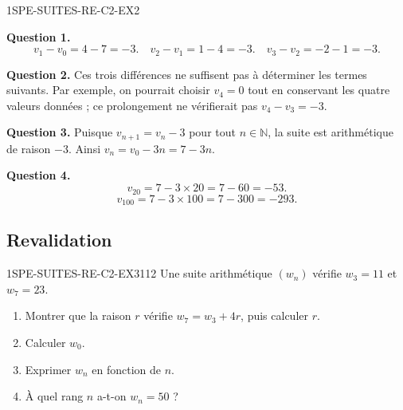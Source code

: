 
\begin{corrige}{1SPE-SUITES-RE-C2-EX2}

\textbf{Question 1.}
\[
v_1 - v_0 = 4 - 7 = -3. \quad v_2 - v_1 = 1 - 4 = -3. \quad v_3 - v_2 = -2 - 1 = -3.
\]


\textbf{Question 2.} Ces trois différences ne suffisent pas à déterminer les
termes suivants. Par exemple, on pourrait choisir $v_4=0$ tout en conservant
les quatre valeurs données ; ce prolongement ne vérifierait pas
$v_4-v_3=-3$.


\textbf{Question 3.} Puisque $v_{n+1}=v_n-3$ pour tout
$n\in\mathbb{N}$, la suite est arithmétique de raison $-3$. Ainsi
$v_n=v_0-3n=7-3n$.

\textbf{Question 4.}
\[
v_{20} = 7 - 3 \times 20 = 7 - 60 = -53.
\]
\[
v_{100} = 7 - 3 \times 100 = 7 - 300 = -293.
\]

\end{corrige}

\subsection*{Revalidation}


\begin{exercice}{1SPE-SUITES-RE-C2-EX3}{1}{12}
Une suite arithmétique $(w_n)$ vérifie $w_3 = 11$ et $w_7 = 23$.
\begin{enumerate}
  \item Montrer que la raison $r$ vérifie $w_7 = w_3 + 4r$, puis calculer $r$.
  \item Calculer $w_0$.
  \item Exprimer $w_n$ en fonction de $n$.
  \item À quel rang $n$ a-t-on $w_n = 50$ ?
\end{enumerate}
\end{exercice}

